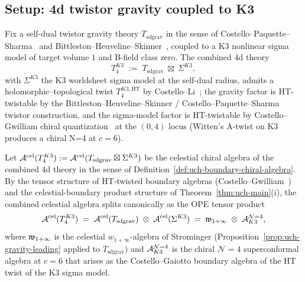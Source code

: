 \subsection{Setup: 4d twistor gravity coupled to K3}
\label{subsec:cmb-setup}

Fix a self-dual twistor gravity theory $T_{\mathrm{sd grav}}$ in the
sense of Costello--Paquette--Sharma~\cite{CostelloPaquetteSharmaCelestial}
and Bittleston--Heuveline--Skinner~\cite{BittlestonHeuvelineSkinner},
coupled to a K3 nonlinear sigma model of target volume $1$ and
B-field class zero. The combined $4$d theory
\begin{equation}
\label{eq:cmb-combined-theory}
T_4^{K3}
\;:=\;
T_{\mathrm{sd grav}} \;\boxtimes\; \Sigma^{K3},
\end{equation}
with $\Sigma^{K3}$ the K3 worldsheet sigma model at the self-dual
radius, admits a holomorphic--topological twist $T_4^{K3,\mathrm{HT}}$
by Costello--Li~\cite{CL16}; the gravity factor is
HT-twistable by the Bittleston--Heuveline--Skinner / Costello--Paquette--Sharma
twistor construction, and the sigma-model factor is HT-twistable by
Costello--Gwilliam chiral quantization~\cite{CostelloGwilliamVolI,
CostelloGwilliamVolII} at the $(0,4)$ locus (Witten's A-twist on K3
produces a chiral N=4 at $c=6$).

\begin{definition}
\label{def:cmb-combined-cel-algebra}
Let $\mathcal A^{\mathrm{cel}}(T_4^{K3}) := \mathcal A^{\mathrm{cel}}(T_{\mathrm{sd grav}} \boxtimes \Sigma^{K3})$
be the celestial chiral algebra of the combined 4d theory in the sense
of Definition~\ref{def:uch-boundary-chiral-algebra}. By the tensor
structure of HT-twisted boundary algebras
(Costello--Gwilliam~\cite[\S 4]{CostelloGwilliamVolII}) and the
celestial-boundary product structure of
Theorem~\ref{thm:uch-main}(i), the combined celestial algebra splits
canonically as the OPE tensor product
\begin{equation}
\label{eq:cmb-tensor-decomposition}
\mathcal A^{\mathrm{cel}}(T_4^{K3})
\;=\;
\mathcal A^{\mathrm{cel}}(T_{\mathrm{sd grav}}) \;\otimes\; \mathcal A^{\mathrm{cel}}(\Sigma^{K3})
\;=\;
\mathfrak w_{1+\infty} \;\otimes\; \mathcal A^{\mathcal{N}{=}4}_{K3},
\end{equation}
where $\mathfrak w_{1+\infty}$ is the celestial $w_{1+\infty}$-algebra of Strominger
(Proposition~\ref{prop:uch-gravity-leading} applied to
$T_{\mathrm{sd grav}}$) and $\mathcal A^{\mathcal{N}{=}4}_{K3}$ is the chiral
$\mathcal{N}{=}4$ superconformal algebra at $c = 6$ that arises as the
Costello--Gaiotto boundary algebra of the HT twist of the K3 sigma
model.
\end{definition}

